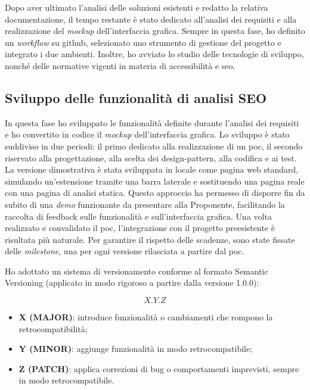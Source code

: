 \vspace{5pt}
\noindent Dopo aver ultimato l’analisi delle soluzioni esistenti e redatto la relativa documentazione, il tempo restante è stato dedicato all’analisi dei \gls{requisiti} e alla realizzazione del \textit{mockup} dell’interfaccia grafica. Sempre in questa fase, ho definito un \textit{workflow} su \gls{github}, selezionato uno strumento di gestione del progetto e integrato i due ambienti. Inoltre, ho avviato lo studio delle tecnologie di sviluppo, nonché delle normative vigenti in materia di accessibilità e \gls{seo}.

\subsection{Sviluppo delle funzionalità di analisi SEO}

In questa fase ho sviluppato le funzionalità definite durante l’analisi dei \gls{requisiti} e ho convertito in codice il \textit{mockup} dell’interfaccia grafica. Lo sviluppo è stato suddiviso in due periodi: il primo dedicato alla realizzazione di un \gls{poc}, il secondo riservato alla progettazione, alla scelta dei \gls{design-pattern}, alla codifica e ai test. La versione dimostrativa è stata sviluppata in locale come pagina web standard, simulando un’estensione tramite una barra laterale e sostituendo una pagina reale con una pagina di analisi statica. Questo approccio ha permesso di disporre fin da subito di una \textit{demo} funzionante da presentare alla Proponente, facilitando la raccolta di feedback sulle funzionalità e sull’interfaccia grafica. Una volta realizzato e convalidato il \gls{poc}, l’integrazione con il progetto preesistente è risultata più naturale. Per garantire il rispetto delle scadenze, sono state fissate delle \textit{milestone}, una per ogni versione rilasciata a partire dal \gls{poc}.

\vspace{10pt}
\noindent Ho adottato un sistema di versionamento conforme al formato Semantic Versioning (applicato in modo rigoroso a partire dalla versione 1.0.0):

\[
X.Y.Z
\]

\begin{itemize}
  \item \textbf{X (MAJOR)}: introduce funzionalità o cambiamenti che rompono  la retrocompatibilità;
  \item \textbf{Y (MINOR)}: aggiunge funzionalità in modo retrocompatibile;
  \item \textbf{Z (PATCH)}: applica correzioni di bug o comportamenti imprevisti, sempre in modo retrocompatibile.
\end{itemize}

